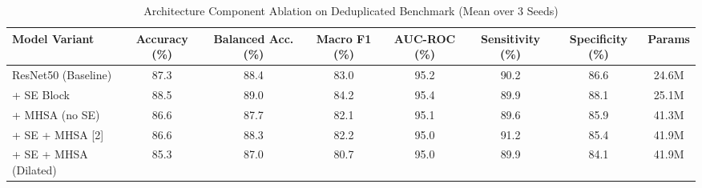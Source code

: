 \begin{table}[t]
\centering
\caption{Architecture Component Ablation on Deduplicated Benchmark (Mean over 3 Seeds)}
\label{tab:ablation}
\begin{tabular}{lccccccc}
\toprule
\textbf{Model Variant} & \textbf{Accuracy (\%)} & \textbf{Balanced Acc. (\%)} & \textbf{Macro F1 (\%)} & \textbf{AUC-ROC (\%)} & \textbf{Sensitivity (\%)} & \textbf{Specificity (\%)} & \textbf{Params} \\
\midrule
ResNet50 (Baseline) & 87.3 & 88.4 & 83.0 & 95.2 & 90.2 & 86.6 & 24.6M \\
+ SE Block & 88.5 & 89.0 & 84.2 & 95.4 & 89.9 & 88.1 & 25.1M \\
+ MHSA (no SE) & 86.6 & 87.7 & 82.1 & 95.1 & 89.6 & 85.9 & 41.3M \\
+ SE + MHSA [2] & 86.6 & 88.3 & 82.2 & 95.0 & 91.2 & 85.4 & 41.9M \\
+ SE + MHSA (Dilated) & 85.3 & 87.0 & 80.7 & 95.0 & 89.9 & 84.1 & 41.9M \\
\bottomrule
\end{tabular}
\end{table}
